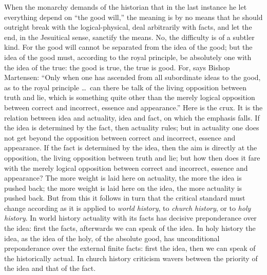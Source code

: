 \documentclass[12pt]{book}
\newcommand{\opage}[1]{\marginnote{\footnotesize\textit{[#1]}}}
\begin{document}
When the monarchy demands of the historian that in the last instance he let everything depend on ``the good will,'' the meaning is by no means that he should outright break with the logical-physical, deal arbitrarily with facts, and let the end, in the Jesuitical sense, sanctify the means. No, the difficulty is of a subtler kind. For the good will cannot be separated from the idea of the good; but the idea of the good must, according to the royal principle, be absolutely one with the idea of the true: the good is true, the true is good.
\opage{42}\setcounter{footnote}{0}%
For, says Bishop Martensen: ``Only when one has ascended from all subordinate ideas to the good, as to the royal principle \dots\ can there be talk of the living opposition between truth and lie, which is something quite other than the merely logical opposition between correct and incorrect, essence and appearance.'' Here is the crux. It is the relation between idea and actuality, idea and fact, on which the emphasis falls. If the idea is determined by the fact, then actuality rules; but in actuality one does not get beyond the opposition between correct and incorrect, essence and appearance. If the fact is determined by the idea, then the aim is directly at the opposition, the living opposition between truth and lie; but how then does it fare with the merely logical opposition between correct and incorrect, essence and appearance? The more weight is laid here on actuality, the more the idea is pushed back; the more weight is laid here on the idea, the more actuality is pushed back. But from this it follows in turn that the critical standard must change according as it is applied to \emph{world history}, to \emph{church history}, or to \emph{holy history}. In world history actuality with its facts has decisive preponderance over the idea: first the facts, afterwards we can speak of the idea. In holy history the idea, as the idea of the holy, of the absolute good, has unconditional preponderance over the external finite facts: first the idea, then we can speak of the historically actual. In church history criticism wavers between the priority of the idea and that of the fact.
\end{document}
